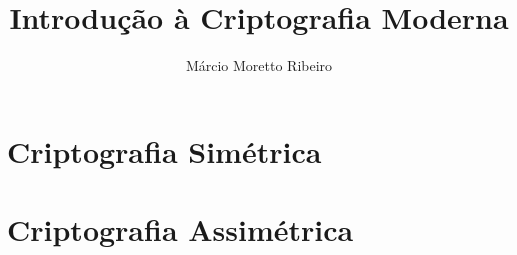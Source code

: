 \documentclass[a4,12pt]{book}
\begin{document}


\author{Márcio Moretto Ribeiro}

\title{Introdução à Criptografia Moderna}

\maketitle

\setcounter{tocdepth}{1} %
\tableofcontents




\part{Criptografia Simétrica}






\part{Criptografia Assimétrica}





\appendix

%
%
%
%
%
%
%


\end{document}
